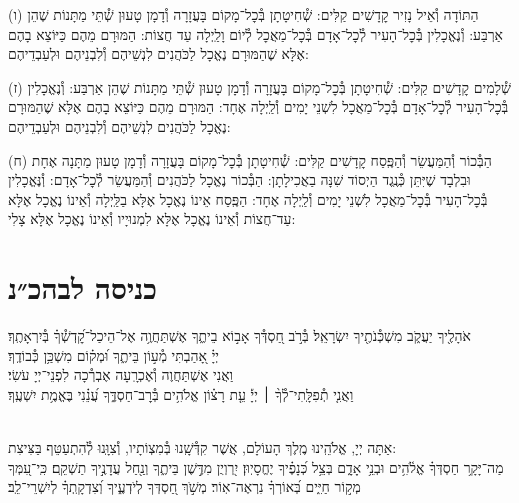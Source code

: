\documentclass[twoside, openany, parskip=half, 11pt]{book}
\begin{document}
(ו) הַתּוֹדָה וְ֯אֵיל נָזִיר קׇדָשִׁים קַלִּים: שְׁ֯חִיטָתָן בְּ֯כׇל־מָקוֹם בָּעֲזָרָה וְ֯דָמָן טָעוּן שְׁ֯תֵּי מַתָּנוֹת שֶׁהֵן אַרְבַּע: וְ֯נֶאֱכָלִין בְּ֯כׇל־הָעִיר לְ֯כׇל־אָדָם בְּ֯כׇל־מַאֲכׇל לְ֯יוֹם וָלַֽיְלָה עַד חֲצוֹת: הַמּוּרָם מֵהֶם כַּיּוֹצֵא בָהֶם אֶלָּא שֶׁהַמּוּרָם נֶאֱכָל לַכֹּהֲנִים לִנְשֵׁיהֶם וְ֯לִבְנֵיהֶם וּלְעַבְדֵיהֶם:

(ז) שְׁ֯לָמִים קׇדָשִׁים קַלִּים: שְׁ֯חִיטָתָן בְּ֯כׇל־מָקוֹם בָּעֲזָרָה וְ֯דָמָן טָעוּן שְׁ֯תֵּי מַתָּנוֹת שֶׁהֵן אַרְבַּע: וְ֯נֶאֱכָלִין בְּ֯כׇל־הָעִיר לְ֯כׇל־אָדָם בְּ֯כׇל־מַאֲכָל לִשְׁנֵי יָמִים וְ֯לַֽיְלָה אֶחָד: הַמּוּרָם מֵהֶם כַּיּוֹצֵא בָהֶם אֶלָּא שֶׁהַמּוּרָם נֶאֱכָל לַכֹּהֲנִים לִנְשֵׁיהֶם וְ֯לִבְנֵיהֶם וּלְעַבְדֵיהֶם:

(ח) הַבְּ֯כוֹר וְ֯הַמַּעֲשֵׂר וְ֯הַפֶּֽסַח קׇדָשִׁים קַלִּים: שְׁ֯חִיטָתָן בְּ֯כׇל־מָקוֹם בָּעֲזָרָה וְ֯דָמָן טָעוּן מַתָּנָה אֶחָת וּבִלְבָד שֶׁיִּתֵּן כְּ֯נֶֽגֶד הַיְסוֹד שִׁנָּה בַאֲכִילָתָן: הַבְּ֯כוֹר נֶאֱכָל לַכֹּהֲנִים וְ֯הַמַּעֲשֵׂר לְ֯כׇל־אָדָם: וְ֯נֶּאֱכָלִין בְּ֯כׇל־הָעִיר בְּ֯כׇל־מַאֲכָל לִשְׁנֵי יָמִים וְ֯לַֽיְלָה אֶחָד: הַפֶּֽסַח אֵינוֹ נֶאֱכָל אֶלָּא בַלַּֽיְלָה וְ֯אֵינוֹ נֶאֱכָל אֶלָּא עַד־חֲצוֹת וְ֯אֵינוֹ נֶאֱכָל אֶלָּא לִמְנוּיָיו וְ֯אֵינוֹ נֶאֱכָל אֶלָּא צָלִי:\\


\section[כניסה לבהכ״נ]{ כניסה לבהכ״נ }
אֹהָלֶ֖יךָ יַעֲקֹ֑ב מִשְׁכְּ֯נֹתֶ֖יךָ יִשְׂרָאֵֽל׃
בְּ֯רֹ֣ב חַ֭סְדְּ֯ךָ אָב֣וֹא בֵיתֶ֑ךָ אֶשְׁתַּחֲוֶ֥ה אֶל־הֵיכַל־קׇ֝דְשְׁ֯ךָ֗ בְּ֯יִרְאָתֶֽךָ׃\\
יְיָ֗ אָ֭הַבְתִּי מְ֯ע֣וֹן בֵּיתֶ֑ךָ וּ֝מְק֗וֹם מִשְׁכַּ֥ן כְּ֯בוֹדֶֽךָ׃ \\
וַאֲנִי אֶשְׁתַּחֲוֶה וְ֯אֶכְרָֽעָה אֶבְרְ֯כָה לִפְנֵי־יְיָ עֹשִׂי׃\\
וַאֲנִ֤י
%
תְ֯פִלָּֽתִי־לְ֯ךָ֨ ׀ יְיָ֡ עֵ֤ת רָצ֗וֹן אֱלֹהִ֥ים בְּ֯רׇב־חַסְדֶּ֑ךָ עֲ֝נֵ֗נִי בֶּאֱמֶ֥ת יִשְׁעֶֽךָ׃

\\
אַתָּה יְיָ, אֱלֹהֵֽינוּ מֶֽלֶךְ הָעוֹלָם, אֲשֶׁר קִדְּ֯שָֽׁנוּ בְּ֯מִצְוֹתָיו, וְ֯צִוָּֽנוּ לְ֯הִתְעַטֵּף בַּצִּיצִת:\\
מַה־יָּקָ֥ר חַסְדְּךָ֗ אֱלֹ֫הִ֥ים וּבְנֵ֥י אָדָ֑ם בְּצֵ֥ל כְּ֝נָפֶ֗יךָ יֶחֱסָיֽוּן׃
יִ֭רְוְיֻן מִדֶּ֣שֶׁן בֵּיתֶ֑ךָ וְנַ֖חַל עֲדָנֶ֣יךָ תַשְׁקֵֽם׃
כִּֽי־עִ֭מְּךָ מְק֣וֹר חַיִּ֑ים בְּ֝אוֹרְךָ֗ נִרְאֶה־אֽוֹר׃
מְשֹׁ֣ךְ חַ֭סְדְּךָ לְיֹדְעֶ֑יךָ וְ֝צִדְקָֽתְךָ֗ לְיִשְׁרֵי־לֵֽב׃
\end{document}
